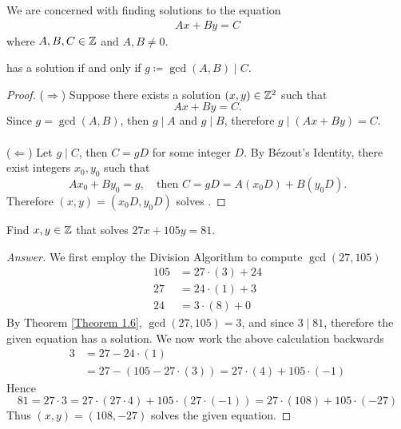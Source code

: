 \vspace*{1em}

We are concerned with finding solutions to the equation
\begin{align*}\label{lde}
Ax + By = C \tag{$\bigstar$}
\end{align*}
where $A,B,C \in \mathbb Z$ and $A,B \neq 0$.

\vspace*{1em}

\begin{theorem}
 has a solution if and only if $g \coloneqq \gcd(A,B) \mid C$.
\end{theorem}
\begin{proof}
($\Rightarrow$) Suppose there exists a solution $(x,y) \in \mathbb Z^2$ such that 
\[Ax + By = C.\]
Since $g = \gcd(A,B)$, then $g\mid A$ and $g\mid B$, therefore $g\mid (Ax+ By) = C$.\\
\\
($\Leftarrow$) Let $g\mid C$, then $C = gD$ for some integer $D$. By B\'ezout's Identity, there exist integers $x_0,y_0$ such that 
\[Ax_0 + By_0  = g,\quad \text{then } C = gD = A(x_0D) + B(y_0D).\]
Therefore $(x,y) = (x_0D,y_0D)$ solves .
\end{proof}

\vspace*{1em}

\begin{example}\label{example 2.1}
Find $x,y \in \mathbb Z$ that solves $27x + 105y = 81$.
\end{example}
\begin{proof}[Answer]
We first employ the Division Algorithm to compute $\gcd(27,105)$
\begin{align*}
105 &= 27\cdot(3) + 24\\[0.25em]
27 &= 24\cdot (1) + 3\\[0.25em]
24 &= 3\cdot(8) + 0
\end{align*}
By Theorem \ref{Theorem 1.6}, $\gcd(27,105) = 3$, and since $3\mid 81$, therefore the given equation has a solution. We now work the above calculation backwards
\begin{align*}
3 &= 27 - 24\cdot(1)\\[0.25em]
&= 27 - (105 - 27\cdot(3)) = 27\cdot (4) + 105\cdot(-1)
\end{align*}
Hence
\[81 = 27\cdot 3 = 27\cdot (27\cdot 4) + 105\cdot(27\cdot(-1)) = 27\cdot (108) + 105\cdot (-27)\]
Thus $(x,y) = (108,-27)$ solves the given equation.
\end{proof}

